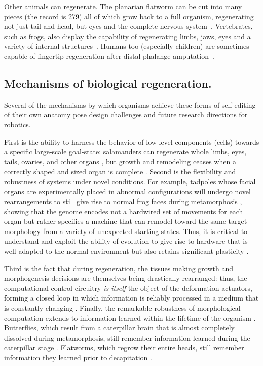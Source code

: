 Other animals can regenerate.
The planarian flatworm can be cut into many pieces (the record is 279) all of which grow back to a full organism, regenerating not just tail and head, but eyes and the complete nervous system~\cite{montgomery1974minimal}.
Vertebrates, such as 
frogs, also display the capability of regenerating limbs, 
jaws, eyes and a variety of internal structures~\cite{brockes1997amphibian}. 
Humans too (especially children) are sometimes capable of fingertip regeneration after distal phalange amputation~\cite{illingworth1974trapped}. 

\subsection{Mechanisms of biological regeneration.}

Several of the mechanisms by which organisms achieve these forms of 
self-editing of their own anatomy pose design
challenges and future research directions for robotics.

First is the ability to harness the behavior of low-level components (cells) towards a specific large-scale goal-state: salamanders can regenerate whole limbs, eyes, tails, ovaries, and other organs \cite{mccusker2011axolotl},
but growth and remodeling ceases when a correctly shaped and sized organ is complete \cite{pezzulo2016top}.
Second is the flexibility and robustness of systems under novel conditions. For example, tadpoles whose facial organs are experimentally placed in abnormal configurations will undergo novel rearrangements to still give rise to normal frog faces during metamorphosis \cite{vandenberg2012normalized}, 
showing that the genome encodes not a hardwired set of movements for each organ but rather specifies a machine that can remodel toward the same target morphology from a variety of unexpected starting states. 
Thus, it is critical to understand and exploit the ability of evolution to give rise to hardware that is well-adapted to the normal environment but also retains significant plasticity \cite{sullivan2016physiological}. 

Third is the fact that during regeneration, the tissues making growth and morphogenesis decisions are themselves being drastically rearranged: thus, the computational control circuitry \textit{is itself} the object of the deformation actuators, forming a closed loop in which information is reliably processed in a medium that is constantly changing \cite{pezzulo2015re}. 
Finally, the remarkable robustness of morphological computation extends to information learned within the lifetime of the organism \cite{blackiston2015stability}.
Butterflies, which result from a caterpillar brain that is almost completely dissolved during metamorphosis, still remember information learned during the caterpillar stage \cite{blackiston2008retention}. 
Flatworms, which regrow their entire heads, still remember information they learned prior to decapitation \cite{corning1967regeneration, shomrat2013automated}. 


